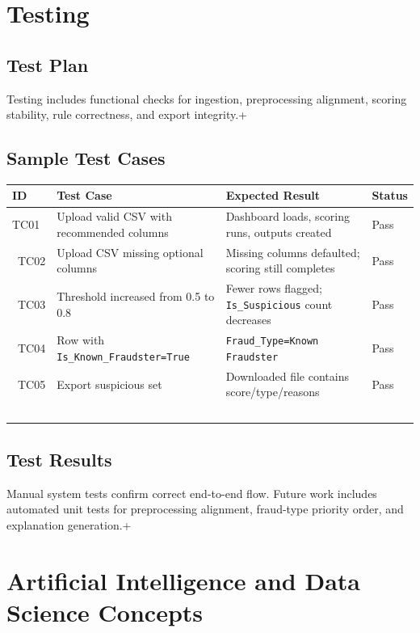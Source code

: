 \documentclass[12pt,a4paper]{report}
\begin{document}
\chapter{Testing}
\section{Test Plan}
Testing includes functional checks for ingestion, preprocessing alignment, scoring stability, rule correctness, and export integrity.\n+
\section{Sample Test Cases}
\begin{longtable}{p{2cm}p{6cm}p{3cm}p{3cm}}
\toprule
\textbf{ID} & \textbf{Test Case} & \textbf{Expected Result} & \textbf{Status} \\\midrule
TC01 & Upload valid CSV with recommended columns & Dashboard loads, scoring runs, outputs created & Pass \\\
TC02 & Upload CSV missing optional columns & Missing columns defaulted; scoring still completes & Pass \\\
TC03 & Threshold increased from 0.5 to 0.8 & Fewer rows flagged; \texttt{Is\_Suspicious} count decreases & Pass \\\
TC04 & Row with \texttt{Is\_Known\_Fraudster=True} & \texttt{Fraud\_Type=Known Fraudster} & Pass \\\
TC05 & Export suspicious set & Downloaded file contains score/type/reasons & Pass \\\
\bottomrule
\end{longtable}

\section{Test Results}
Manual system tests confirm correct end-to-end flow. Future work includes automated unit tests for preprocessing alignment, fraud-type priority order, and explanation generation.\n+
\chapter{Artificial Intelligence and Data Science Concepts}
\end{document}
